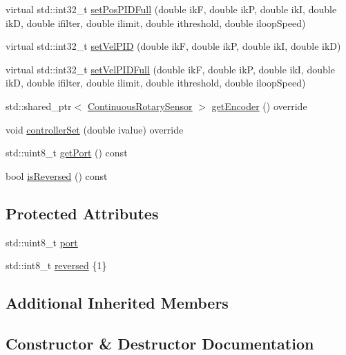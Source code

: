 \begin{DoxyCompactItemize}
virtual std\+::int32\+\_\+t \mbox{\hyperlink{classokapi_1_1Motor_afe4ae812a9454167fc6ebef8713c716c}{set\+Pos\+P\+I\+D\+Full}} (double ikF, double ikP, double ikI, double ikD, double ifilter, double ilimit, double ithreshold, double iloop\+Speed)
\item 
virtual std\+::int32\+\_\+t \mbox{\hyperlink{classokapi_1_1Motor_afe462dda44723c4e39f9ef9d1a95e23e}{set\+Vel\+P\+ID}} (double ikF, double ikP, double ikI, double ikD)
\item 
virtual std\+::int32\+\_\+t \mbox{\hyperlink{classokapi_1_1Motor_a2719aabe6b89b8195c93614e5ce7b9f6}{set\+Vel\+P\+I\+D\+Full}} (double ikF, double ikP, double ikI, double ikD, double ifilter, double ilimit, double ithreshold, double iloop\+Speed)
\item 
std\+::shared\+\_\+ptr$<$ \mbox{\hyperlink{classokapi_1_1ContinuousRotarySensor}{Continuous\+Rotary\+Sensor}} $>$ \mbox{\hyperlink{classokapi_1_1Motor_a57d8ddb900475fcfba56413e61e6e252}{get\+Encoder}} () override
\item 
void \mbox{\hyperlink{classokapi_1_1Motor_a262c36a80a942d125e574d691b77b440}{controller\+Set}} (double ivalue) override
\item 
std\+::uint8\+\_\+t \mbox{\hyperlink{classokapi_1_1Motor_ac1f1ac84ac7a96dab84cc0c0023a2ae4}{get\+Port}} () const
\item 
bool \mbox{\hyperlink{classokapi_1_1Motor_a75a2c72a1c941b07cea677bc4ba2e42d}{is\+Reversed}} () const
\end{DoxyCompactItemize}
\subsection*{Protected Attributes}
\begin{DoxyCompactItemize}
\item 
std\+::uint8\+\_\+t \mbox{\hyperlink{classokapi_1_1Motor_a25a8cc5b2fe8e50d83c42129b0d57b7e}{port}}
\item 
std\+::int8\+\_\+t \mbox{\hyperlink{classokapi_1_1Motor_ad5d21f1324cc2dc887075eb11c38149d}{reversed}} \{1\}
\end{DoxyCompactItemize}
\subsection*{Additional Inherited Members}


\subsection{Constructor \& Destructor Documentation}
\mbox{\label{classokapi_1_1Motor_a6509ec14fe9e1c48c705fe74154873dd}} 
